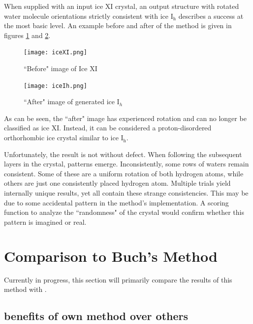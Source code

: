 When supplied with an input ice XI crystal, an output structure with rotated water molecule orientations strictly consistent with ice I$_{\mathrm{h}}$ describes a success at the most basic level.
An example before and after of the method is given in figures \ref{fig:iceXI} and \ref{fig:iceIh}.
\begin{figure}
	
	\centering
	
	\texttt{[image: iceXI.png]}
	
	\caption{``Before" image of Ice XI}
	
	\label{fig:iceXI}
	
\end{figure}
\begin{figure}
	
	\centering
	
	\texttt{[image: iceIh.png]}
	
	\caption{``After" image of generated ice I$_{h}$}
	
	\label{fig:iceIh}
	
\end{figure}
As can be seen, the ``after" image has experienced rotation and can no longer be classified as ice XI. 
Instead, it can be considered a proton-disordered orthorhombic ice crystal similar to ice I$_{\mathrm{h}}$. 

Unfortunately, the result is not without defect.
When following the subsequent layers in the crystal, patterns emerge. 
Inconsistently, some rows of waters remain consistent.
Some of these are a uniform rotation of both hydrogen atoms, while others are just one consistently placed hydrogen atom.
Multiple trials yield internally unique results, yet all contain these strange consistencies.
This may be due to some accidental pattern in the method's implementation.
A scoring function to analyze the ``randomness" of the crystal would confirm whether this pattern is imagined or real.

%
%
%
%
\section{Comparison to Buch's Method}
Currently in progress, this section will primarily compare the results of this method with \cite{MCIce}.
\subsection{benefits of own method over others}
